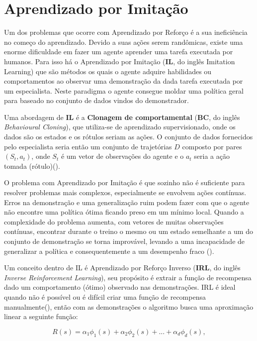 \section{Aprendizado por Imitação}
Um dos problemas que ocorre com Aprendizado por Reforço é a sua ineficiência no começo do aprendizado. Devido a suas ações serem randômicas, existe uma enorme dificuldade em fazer um agente aprender uma tarefa executada por humanos. Para isso há o Aprendizado por Imitação (\textbf{IL}, do inglês Imitation Learning) que são métodos os quais o agente adquire habilidades ou comportamentos ao observar uma demonstração da dada tarefa executada por um especialista. Neste paradigma o agente consegue moldar uma política geral para baseado no conjunto de dados vindos do demonstrador.

Uma abordagem de \textbf{IL} é a \textbf{Clonagem de comportamental} (\textbf{BC}, do inglês \textit{Behavioural Cloning}), que utiliza-se de aprendizado supervisionado, onde os dados são os estados e os rótulos seriam as ações. O conjunto de dados fornecidos pelo especialista seria então um conjunto de trajetórias $D$ composto por pares $(S_t, a_t)$, onde $S_t$ é um vetor de observações do agente e o $a_t$ seria a ação tomada (rótulo)().

O problema com Aprendizado por Imitação é que sozinho não é suficiente para resolver problemas mais complexos, especialmente se envolvem ações contínuas. Erros na demonstração e uma generalização ruim podem fazer com que o agente não encontre uma política ótima ficando preso em um mínimo local. Quando a complexidade do problema aumenta, com vetores de muitas observações contínuas, encontrar durante o treino o mesmo ou um estado semelhante a um do conjunto de demonstração se torna improvável, levando a uma incapacidade de generalizar a política e consequentemente a um desempenho fraco ().

Um conceito dentro de IL é Aprendizado por Reforço Inverso (\textbf{IRL}, do inglês \textit{Inverse Reinforcement Learning}), seu propósito é extrair a função de recompensa dado um comportamento (ótimo) observado nas demonstrações. IRL é ideal quando não é possível ou é difícil criar uma função de recompensa manualmente(), então com as demonstrações o algoritmo busca uma aproximação linear a seguinte função:

\begin{equation}
   R(s) = \alpha_1 \phi_1(s) + \alpha_2 \phi_2(s) + ... + \alpha_d \phi_d(s),
\end{equation}

